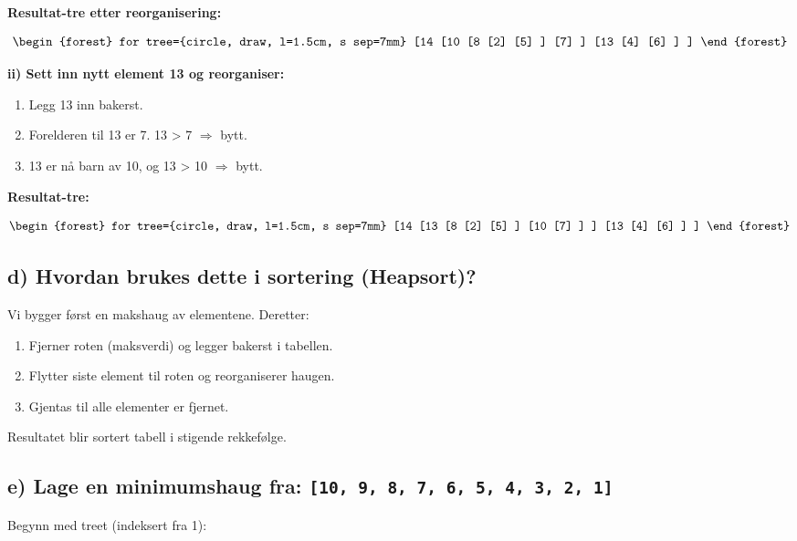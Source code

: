 \documentclass[12pt]{article}
\begin{document}
\break
\noindent
\textbf{Resultat-tre etter reorganisering:}

\begin{gather*}
\begin{forest}
for tree={circle, draw, l=1.5cm, s sep=7mm}
[14
  [10
    [8
        [2]
        [5]
    ]
    [7]
  ]
  [13
    [4]
    [6]
  ]
]
\end{forest}
\end{gather*}

\noindent
\textbf{ii) Sett inn nytt element 13 og reorganiser:}

\begin{enumerate}
    \item Legg 13 inn bakerst.
    \item Forelderen til 13 er 7. 13 > 7 $\Rightarrow$ bytt.
    \item 13 er nå barn av 10, og 13 > 10 $\Rightarrow$ bytt.
\end{enumerate}

\noindent
\textbf{Resultat-tre:}

\begin{gather*}
\begin{forest}
for tree={circle, draw, l=1.5cm, s sep=7mm}
[14
  [13
    [8
        [2]
        [5]
    ]
    [10
        [7]
    ]
  ]
  [13
    [4]
    [6]
  ]
]
\end{forest}
\end{gather*}

\break
\subsection*{d) Hvordan brukes dette i sortering (Heapsort)?}
Vi bygger først en makshaug av elementene. Deretter:
\begin{enumerate}
    \item Fjerner roten (maksverdi) og legger bakerst i tabellen.
    \item Flytter siste element til roten og reorganiserer haugen.
    \item Gjentas til alle elementer er fjernet.
\end{enumerate}
Resultatet blir sortert tabell i stigende rekkefølge.

\subsection*{e) Lage en minimumshaug fra: \texttt{[10, 9, 8, 7, 6, 5, 4, 3, 2, 1]}}
Begynn med treet (indeksert fra 1):
\end{document}
